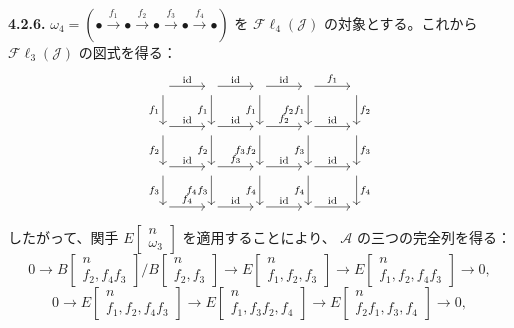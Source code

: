 \medskip\noindent\textbf{4.2.6.}
$\omega_4=(\mathord\bullet\xrightarrow{f_1}\mathord\bullet
\xrightarrow{f_2}\mathord\bullet\xrightarrow{f_3}\mathord\bullet
\xrightarrow{f_4}\mathord\bullet)$
を $\mathcal{F}\ell_4(\mathcal J)$ の対象とする。これから
$\mathcal{F}\ell_3(\mathcal J)$ の図式を得る：
\[
\begin{tikzcd}[column sep=2.6em,row sep=2.15em]
{}\arrow[r,"\mathrm{id}"]\arrow[d,"f_1"']&
{}\arrow[r,"\mathrm{id}"]\arrow[d,"f_1"']&
{}\arrow[r,"\mathrm{id}"]\arrow[d,"f_1"']&
{}\arrow[r,"f_1"]\arrow[d,"f_2f_1"']&
{}\arrow[d,"f_2"]\\
{}\arrow[r,"\mathrm{id}"]\arrow[d,"f_2"']&
{}\arrow[r,"\mathrm{id}"]\arrow[d,"f_2"']&
{}\arrow[r,"f_2"]\arrow[d,"f_3f_2"']&
{}\arrow[r,"\mathrm{id}"]\arrow[d,"f_3"']&
{}\arrow[d,"f_3"]\\
{}\arrow[r,"\mathrm{id}"]\arrow[d,"f_3"']&
{}\arrow[r,"f_3"]\arrow[d,"f_4f_3"']&
{}\arrow[r,"\mathrm{id}"]\arrow[d,"f_4"']&
{}\arrow[r,"\mathrm{id}"]\arrow[d,"f_4"']&
{}\arrow[d,"f_4"]\\
{}\arrow[r,"f_4"]&
{}\arrow[r,"\mathrm{id}"]&
{}\arrow[r,"\mathrm{id}"]&
{}\arrow[r,"\mathrm{id}"]&{}
\end{tikzcd}
\]
したがって、関手
$E\!\begin{bmatrix}n\\ \omega_3\end{bmatrix}$ を適用することにより、
$\mathcal A$ の三つの完全列を得る：
\[
0\longrightarrow
B\!\begin{bmatrix}n\\ f_2,f_4f_3\end{bmatrix}
 \Big/
B\!\begin{bmatrix}n\\ f_2,f_3\end{bmatrix}
\longrightarrow
E\!\begin{bmatrix}n\\ f_1,f_2,f_3\end{bmatrix}
\longrightarrow
E\!\begin{bmatrix}n\\ f_1,f_2,f_4f_3\end{bmatrix}
\longrightarrow0,
\]
\[
0\longrightarrow
E\!\begin{bmatrix}n\\ f_1,f_2,f_4f_3\end{bmatrix}
\longrightarrow
E\!\begin{bmatrix}n\\ f_1,f_3f_2,f_4\end{bmatrix}
\longrightarrow
E\!\begin{bmatrix}n\\ f_2f_1,f_3,f_4\end{bmatrix}
\longrightarrow0,
\]
\endgroup
